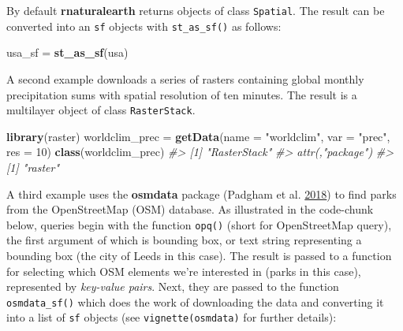 \documentclass[]{krantz}
\newenvironment{Shaded}{\begin{snugshade}}{\end{snugshade}}
\newcommand{\CommentTok}[1]{\textcolor[rgb]{0.37,0.37,0.37}{\textit{#1}}}
\newcommand{\DataTypeTok}[1]{\textcolor[rgb]{0.27,0.27,0.27}{#1}}
\newcommand{\DecValTok}[1]{\textcolor[rgb]{0.06,0.06,0.06}{#1}}
\newcommand{\KeywordTok}[1]{\textcolor[rgb]{0.27,0.27,0.27}{\textbf{#1}}}
\newcommand{\NormalTok}[1]{#1}
\newcommand{\OperatorTok}[1]{\textcolor[rgb]{0.43,0.43,0.43}{\textbf{#1}}}
\newcommand{\StringTok}[1]{\textcolor[rgb]{0.5,0.5,0.5}{#1}}
\begin{document}
By default \textbf{rnaturalearth} returns objects of class \texttt{Spatial}.
The result can be converted into an \texttt{sf} objects with \texttt{st\_as\_sf()} as follows:

\begin{Shaded}
\begin{Highlighting}[]
\NormalTok{usa_sf =}\StringTok{ }\KeywordTok{st_as_sf}\NormalTok{(usa)}
\end{Highlighting}
\end{Shaded}

A second example downloads a series of rasters containing global monthly precipitation sums with spatial resolution of ten minutes.
The result is a multilayer object of class \texttt{RasterStack}.

\begin{Shaded}
\begin{Highlighting}[]
\KeywordTok{library}\NormalTok{(raster)}
\NormalTok{worldclim_prec =}\StringTok{ }\KeywordTok{getData}\NormalTok{(}\DataTypeTok{name =} \StringTok{"worldclim"}\NormalTok{, }\DataTypeTok{var =} \StringTok{"prec"}\NormalTok{, }\DataTypeTok{res =} \DecValTok{10}\NormalTok{)}
\KeywordTok{class}\NormalTok{(worldclim_prec)}
\CommentTok{#> [1] "RasterStack"}
\CommentTok{#> attr(,"package")}
\CommentTok{#> [1] "raster"}
\end{Highlighting}
\end{Shaded}

A third example uses the \textbf{osmdata} package (Padgham et al. \protect\hyperlink{ref-R-osmdata}{2018}) to find parks from the OpenStreetMap (OSM) database.
As illustrated in the code-chunk below, queries begin with the function \texttt{opq()} (short for OpenStreetMap query), the first argument of which is bounding box, or text string representing a bounding box (the city of Leeds in this case).
The result is passed to a function for selecting which OSM elements we're interested in (parks in this case), represented by \emph{key-value pairs}. Next, they are passed to the function \texttt{osmdata\_sf()} which does the work of downloading the data and converting it into a list of \texttt{sf} objects (see \texttt{vignette(\textquotesingle{}osmdata\textquotesingle{})} for further details):

\begin{Shaded}
\end{Shaded}
\end{document}
